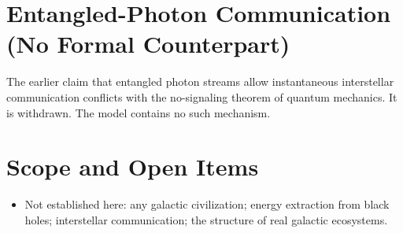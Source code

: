 \documentclass[11pt, a4paper]{article}
\begin{document}
\section{Entangled-Photon Communication (No Formal Counterpart)}
The earlier claim that entangled photon streams allow instantaneous interstellar communication conflicts with the no-signaling theorem of quantum mechanics. It is withdrawn. The model contains no such mechanism.

\section{Scope and Open Items}
\begin{itemize}
  \item Not established here: any galactic civilization; energy extraction from black holes; interstellar communication; the structure of real galactic ecosystems.
\end{itemize}
\end{document}
